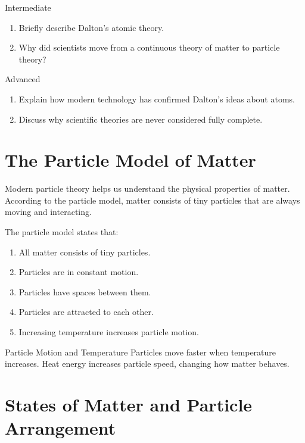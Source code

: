 \begin{tieredquestions}{Intermediate}
\begin{enumerate}
    \item Briefly describe Dalton’s atomic theory.
    \item Why did scientists move from a continuous theory of matter to particle theory?
\end{enumerate}
\end{tieredquestions}

\begin{tieredquestions}{Advanced}
\begin{enumerate}
    \item Explain how modern technology has confirmed Dalton’s ideas about atoms.
    \item Discuss why scientific theories are never considered fully complete.
\end{enumerate}
\end{tieredquestions}

\section{The Particle Model of Matter}

Modern particle theory helps us understand the physical properties of matter. According to the particle model, matter consists of tiny particles that are always moving and interacting.

The particle model states that:
\begin{enumerate}
    \item All matter consists of tiny particles.
    \item Particles are in constant motion.
    \item Particles have spaces between them.
    \item Particles are attracted to each other.
    \item Increasing temperature increases particle motion.
\end{enumerate}

\begin{keyconcept}{Particle Motion and Temperature}
Particles move faster when temperature increases. Heat energy increases particle speed, changing how matter behaves.
\end{keyconcept}

\section{States of Matter and Particle Arrangement}

